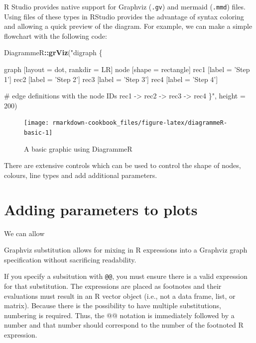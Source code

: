 \documentclass[]{book}
\newenvironment{Shaded}{\begin{snugshade}}{\end{snugshade}}
\newcommand{\DataTypeTok}[1]{\textcolor[rgb]{0.13,0.29,0.53}{#1}}
\newcommand{\DecValTok}[1]{\textcolor[rgb]{0.00,0.00,0.81}{#1}}
\newcommand{\KeywordTok}[1]{\textcolor[rgb]{0.13,0.29,0.53}{\textbf{#1}}}
\newcommand{\NormalTok}[1]{#1}
\newcommand{\OperatorTok}[1]{\textcolor[rgb]{0.81,0.36,0.00}{\textbf{#1}}}
\newcommand{\StringTok}[1]{\textcolor[rgb]{0.31,0.60,0.02}{#1}}
\theoremstyle{definition}
\theoremstyle{definition}
\theoremstyle{definition}
\theoremstyle{remark}
\begin{document}
R Studio provides native support for Graphviz (\texttt{.gv}) and mermaid
(\texttt{.mmd}) files. Using files of these types in RStudio provides
the advantage of syntax coloring and allowing a quick preview of the
diagram. For example, we can make a simple flowchart with the following
code:

\begin{Shaded}
\begin{Highlighting}[]
\NormalTok{DiagrammeR}\OperatorTok{::}\KeywordTok{grViz}\NormalTok{(}\StringTok{"digraph \{}

\StringTok{        graph [layout = dot, rankdir = LR]}
\StringTok{        }
\StringTok{        node [shape = rectangle]        }
\StringTok{        rec1 [label = 'Step 1']}
\StringTok{        rec2 [label = 'Step 2']}
\StringTok{        rec3 [label =  'Step 3']}
\StringTok{        rec4 [label = 'Step 4']}

\StringTok{        # edge definitions with the node IDs}
\StringTok{        rec1 -> rec2 -> rec3 -> rec4}
\StringTok{        \}"}\NormalTok{,}
        \DataTypeTok{height =} \DecValTok{200}\NormalTok{)}
\end{Highlighting}
\end{Shaded}

\begin{figure}

{\centering \texttt{[image: rmarkdown-cookbook\_files/figure-latex/diagrammeR-basic-1]} 

}

\caption{A basic graphic using DiagrammeR}\label{fig:diagrammeR-basic}
\end{figure}

There are extensive controls which can be used to control the shape of
nodes, colours, line types and add additional parameters.

\hypertarget{adding-parameters-to-plots}{%
\section{Adding parameters to plots}\label{adding-parameters-to-plots}}

We can allow

Graphviz substitution allows for mixing in R expressions into a Graphviz
graph specification without sacrificing readability.

If you specify a subsitution with \texttt{@@}, you must ensure there is
a valid expression for that substitution. The expressions are placed as
footnotes and their evaluations must result in an R vector object (i.e.,
not a data frame, list, or matrix). Because there is the possibility to
have multiple substitutions, numbering is required. Thus, the @@
notation is immediately followed by a number and that number should
correspond to the number of the footnoted R expression.
\end{document}
